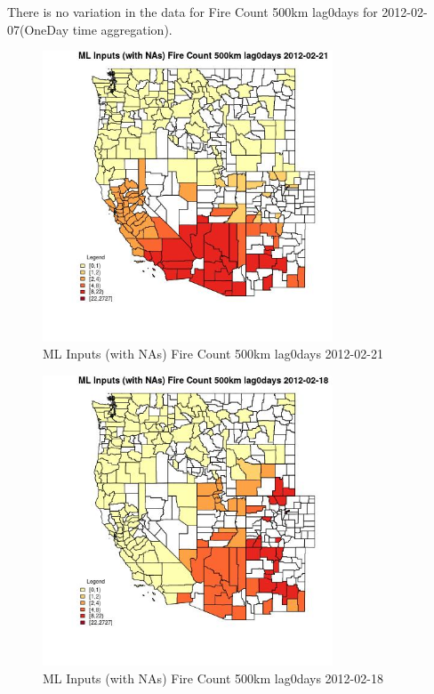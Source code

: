 There is no variation in the data for Fire Count 500km lag0days for 2012-02-07(OneDay time aggregation). 
 

\begin{figure} 
\centering  
\includegraphics[width=0.77\textwidth]{Code_Outputs/Report_ML_input_PM25_Step4_part_f_de_duplicated_aves_prioritize_24hr_obswNAs_CountyFire_Count_500km_lag0daysMean2012-02-21.jpg} 
\caption{\label{fig:Report_ML_input_PM25_Step4_part_f_de_duplicated_aves_prioritize_24hr_obswNAsCountyFire_Count_500km_lag0daysMean2012-02-21}ML Inputs (with NAs) Fire Count 500km lag0days 2012-02-21} 
\end{figure} 
 

\clearpage 

\begin{figure} 
\centering  
\includegraphics[width=0.77\textwidth]{Code_Outputs/Report_ML_input_PM25_Step4_part_f_de_duplicated_aves_prioritize_24hr_obswNAs_CountyFire_Count_500km_lag0daysMean2012-02-18.jpg} 
\caption{\label{fig:Report_ML_input_PM25_Step4_part_f_de_duplicated_aves_prioritize_24hr_obswNAsCountyFire_Count_500km_lag0daysMean2012-02-18}ML Inputs (with NAs) Fire Count 500km lag0days 2012-02-18} 
\end{figure} 
 

